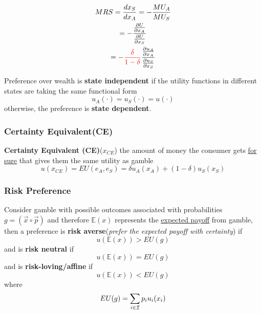 \documentclass[]{article}
\begin{document}
                \begin{gather*}
                        MRS = \frac{d x_S}{d x_A} = -\frac{MU_A}{MU_S} \\
                        = - \frac{\frac{\partial{U}}{\partial{x_A}}}{\frac{\partial{U}}{\partial{x_S}}} \\
                        = - \textcolor{red}{\frac{\delta}{1 - \delta}} \frac{\frac{\partial{u_A}}{\partial{x_A}}}{\frac{\partial{u_S}}{\partial{x_S}}}
                \end{gather*}
                
                \begin{definition}
                    Preference over wealth is \textbf{state independent} if the utility functions in different states are taking the same functional form
                    \[
                        u_A(\cdot) = u_S(\cdot) = u(\cdot)
                    \]
                    otherwise, the preference is \textbf{state dependent}.
                \end{definition}
            
            \subsubsection{Certainty Equivalent(CE)}
                \begin{definition}
                    \textbf{Certainty Equivalent (CE)}($x_{CE}$) the amount of money the consumer gets \ul{for sure} that gives them the same utility as gamble
                    \[
                        u(x_{CE}) = EU(e_A, e_S) = \delta u_A(x_A) + (1 - \delta) u_S(x_S)
                    \]
                \end{definition}
            
            \subsubsection{Risk Preference}
                \begin{definition}
                    Consider gamble with possible outcomes associated with probabilities $g = (\vec{x} \circ \vec{p})$ and therefore $\mathbb{E}(x)$ represents the \ul{expected payoff} from gamble, then a preference is \textbf{risk averse}(\emph{prefer the expected payoff with certainty}) if 
                    \[
                        u(\mathbb{E}(x)) > EU(g)
                    \]
                    and is \textbf{risk neutral} if 
                    \[
                        u(\mathbb{E}(x)) = EU(g)
                    \]
                    and is \textbf{risk-loving/affine} if 
                    \[
                        u(\mathbb{E}(x)) < EU(g)
                    \]
                    where 
                    \[
                        EU(g) = \sum_{i \in \mathcal{{I}}}{p_i u_i(x_i)}
                    \]
                \end{definition}
            
\end{document}
